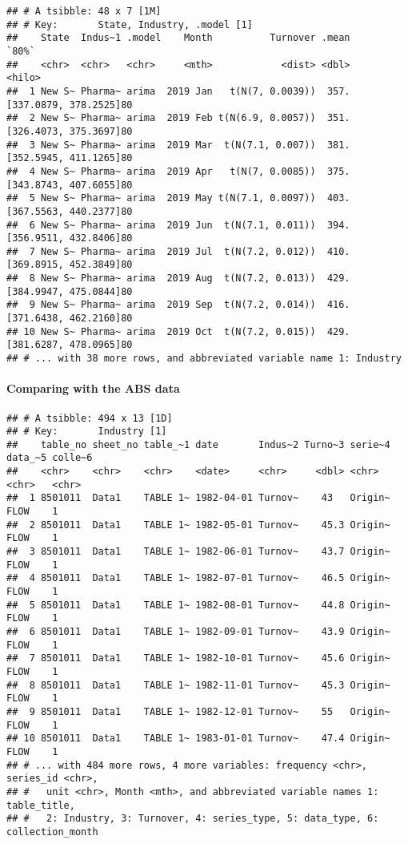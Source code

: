 \documentclass[
]{article}
\begin{document}
\begin{verbatim}
## # A tsibble: 48 x 7 [1M]
## # Key:       State, Industry, .model [1]
##    State  Indus~1 .model    Month          Turnover .mean                  `80%`
##    <chr>  <chr>   <chr>     <mth>            <dist> <dbl>                 <hilo>
##  1 New S~ Pharma~ arima  2019 Jan   t(N(7, 0.0039))  357. [337.0879, 378.2525]80
##  2 New S~ Pharma~ arima  2019 Feb t(N(6.9, 0.0057))  351. [326.4073, 375.3697]80
##  3 New S~ Pharma~ arima  2019 Mar  t(N(7.1, 0.007))  381. [352.5945, 411.1265]80
##  4 New S~ Pharma~ arima  2019 Apr   t(N(7, 0.0085))  375. [343.8743, 407.6055]80
##  5 New S~ Pharma~ arima  2019 May t(N(7.1, 0.0097))  403. [367.5563, 440.2377]80
##  6 New S~ Pharma~ arima  2019 Jun  t(N(7.1, 0.011))  394. [356.9511, 432.8406]80
##  7 New S~ Pharma~ arima  2019 Jul  t(N(7.2, 0.012))  410. [369.8915, 452.3849]80
##  8 New S~ Pharma~ arima  2019 Aug  t(N(7.2, 0.013))  429. [384.9947, 475.0844]80
##  9 New S~ Pharma~ arima  2019 Sep  t(N(7.2, 0.014))  416. [371.6438, 462.2160]80
## 10 New S~ Pharma~ arima  2019 Oct  t(N(7.2, 0.015))  429. [381.6287, 478.0965]80
## # ... with 38 more rows, and abbreviated variable name 1: Industry
\end{verbatim}

\hypertarget{comparing-with-the-abs-data}{%
\paragraph{Comparing with the ABS
data}\label{comparing-with-the-abs-data}}

\begin{verbatim}
## # A tsibble: 494 x 13 [1D]
## # Key:       Industry [1]
##    table_no sheet_no table_~1 date       Indus~2 Turno~3 serie~4 data_~5 colle~6
##    <chr>    <chr>    <chr>    <date>     <chr>     <dbl> <chr>   <chr>   <chr>  
##  1 8501011  Data1    TABLE 1~ 1982-04-01 Turnov~    43   Origin~ FLOW    1      
##  2 8501011  Data1    TABLE 1~ 1982-05-01 Turnov~    45.3 Origin~ FLOW    1      
##  3 8501011  Data1    TABLE 1~ 1982-06-01 Turnov~    43.7 Origin~ FLOW    1      
##  4 8501011  Data1    TABLE 1~ 1982-07-01 Turnov~    46.5 Origin~ FLOW    1      
##  5 8501011  Data1    TABLE 1~ 1982-08-01 Turnov~    44.8 Origin~ FLOW    1      
##  6 8501011  Data1    TABLE 1~ 1982-09-01 Turnov~    43.9 Origin~ FLOW    1      
##  7 8501011  Data1    TABLE 1~ 1982-10-01 Turnov~    45.6 Origin~ FLOW    1      
##  8 8501011  Data1    TABLE 1~ 1982-11-01 Turnov~    45.3 Origin~ FLOW    1      
##  9 8501011  Data1    TABLE 1~ 1982-12-01 Turnov~    55   Origin~ FLOW    1      
## 10 8501011  Data1    TABLE 1~ 1983-01-01 Turnov~    47.4 Origin~ FLOW    1      
## # ... with 484 more rows, 4 more variables: frequency <chr>, series_id <chr>,
## #   unit <chr>, Month <mth>, and abbreviated variable names 1: table_title,
## #   2: Industry, 3: Turnover, 4: series_type, 5: data_type, 6: collection_month
\end{verbatim}
\end{document}

